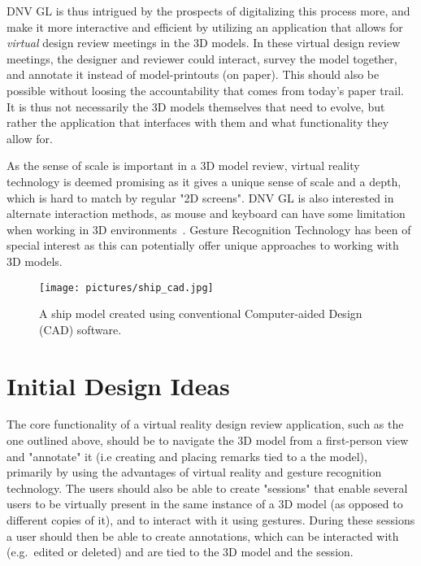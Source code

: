DNV GL is thus intrigued by the prospects of digitalizing this process more, and make it more interactive and efficient by 
utilizing an application that allows for \textit{virtual} design review meetings in the 3D models. In these virtual design review meetings, 
the designer and reviewer could interact, survey the model together, and annotate it instead of model-printouts (on paper). This should also be possible 
without loosing the accountability that comes from today’s paper trail. It is thus not necessarily the 3D models themselves that 
need to evolve, but rather the application that interfaces with them and what functionality they allow for.  

As the sense of scale is important in a 3D model review, virtual reality technology is deemed promising as it gives a unique sense of scale
and a depth, which is hard to match by regular "2D screens". 
DNV GL is also interested in alternate interaction methods, as mouse and keyboard can have some limitation when working in 3D environments~\citep{Rautaray2015}. 
Gesture Recognition Technology has been of special interest as this can potentially offer unique approaches to working with 3D models.

\begin{figure}%
	\texttt{[image: pictures/ship\_cad.jpg]}
	\caption[A ship model created using conventional CAD software.]{A ship model created using conventional Computer-aided Design (CAD) software.~\cite{IMO}}
	\label{fig:ship_cad}
\end{figure} 


\section{Initial Design Ideas}
\label{sec:initial_design}
The core functionality of a virtual reality design review application, such as the one outlined above, should be to navigate the 3D model from a first-person view 
and "annotate" it (i.e creating and placing remarks tied to a the model), primarily by using the advantages of virtual reality and gesture recognition technology.
The users should also be able to create "sessions" that enable several users to be virtually present in the same instance of a 3D model (as opposed to different copies of it),
and to interact with it using gestures. During these sessions a user should then be able to create annotations, 
which can be interacted with (e.g.~edited or deleted) and are tied to the 3D model and the session. 

